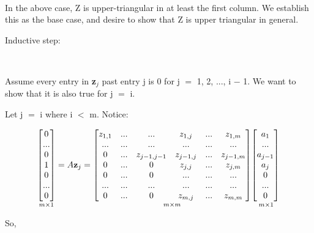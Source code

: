 \documentclass[12pt]{article}
\newcommand{\mt}[1]{\ensuremath{#1}}
\newcommand{\ms}{\mt{-} }
\newcommand{\ls}{\mt{<} }
\newcommand{\eql}{\mt{=} }
\newcommand{\uw}[2]{#1\mt{_{#2}}}
\begin{document}
\

In the above case, Z is upper-triangular in at least the first column. We establish this as the base case, and desire to show that Z is upper triangular in general.

Inductive step:

\

Assume every entry in \uw{\textbf{z}}{j} past entry j is 0 for j \eql 1, 2, ..., i \ms 1. We want to show that it is also true for j \eql i.

Let j \eql i where i \ls m. Notice:

\begin{displaymath}
  \underset{m \times 1}{
\begin{bmatrix}
     0  \\
     ... \\
     0 \\
     1 \\
     0 \\
     ... \\
     0
  \end{bmatrix}
} 
= A\textbf{z}_j = \underset{m \times m}{
\begin{bmatrix}
     z_{1,1} & ... & ... & z_{1, j} & ... & z_{1,m} \\
     ... & ... & ... & ... & ... & ... \\
     0 & ...  & z_{j - 1, j - 1} & z_{j - 1, j} & ... & z_{j - 1, m} \\
     0 & ...  & 0 & z_{j, j} & ... & z_{j, m} \\
     0 & ...  & 0 & ... & ... & ... \\
     ... & ...  & ... & ... & ... & ... \\
     0 & ... & 0 & z_{m, j} & ... & z_{m,m} 
  \end{bmatrix}
}
\underset{m \times 1}{
\begin{bmatrix}
     a_1  \\
     ... \\
     a_{j - 1} \\
     a_j \\
     0 \\
     ... \\
     0
  \end{bmatrix} \\
}
\end{displaymath}

So,
\end{document}
